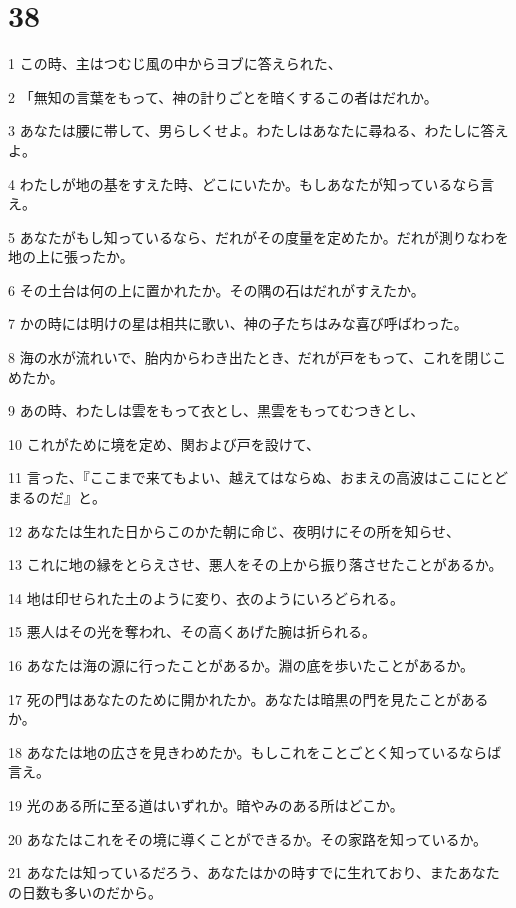 \chapter{38}

\par 1 この時、主はつむじ風の中からヨブに答えられた、
\par 2 「無知の言葉をもって、神の計りごとを暗くするこの者はだれか。
\par 3 あなたは腰に帯して、男らしくせよ。わたしはあなたに尋ねる、わたしに答えよ。
\par 4 わたしが地の基をすえた時、どこにいたか。もしあなたが知っているなら言え。
\par 5 あなたがもし知っているなら、だれがその度量を定めたか。だれが測りなわを地の上に張ったか。
\par 6 その土台は何の上に置かれたか。その隅の石はだれがすえたか。
\par 7 かの時には明けの星は相共に歌い、神の子たちはみな喜び呼ばわった。
\par 8 海の水が流れいで、胎内からわき出たとき、だれが戸をもって、これを閉じこめたか。
\par 9 あの時、わたしは雲をもって衣とし、黒雲をもってむつきとし、
\par 10 これがために境を定め、関および戸を設けて、
\par 11 言った、『ここまで来てもよい、越えてはならぬ、おまえの高波はここにとどまるのだ』と。
\par 12 あなたは生れた日からこのかた朝に命じ、夜明けにその所を知らせ、
\par 13 これに地の縁をとらえさせ、悪人をその上から振り落させたことがあるか。
\par 14 地は印せられた土のように変り、衣のようにいろどられる。
\par 15 悪人はその光を奪われ、その高くあげた腕は折られる。
\par 16 あなたは海の源に行ったことがあるか。淵の底を歩いたことがあるか。
\par 17 死の門はあなたのために開かれたか。あなたは暗黒の門を見たことがあるか。
\par 18 あなたは地の広さを見きわめたか。もしこれをことごとく知っているならば言え。
\par 19 光のある所に至る道はいずれか。暗やみのある所はどこか。
\par 20 あなたはこれをその境に導くことができるか。その家路を知っているか。
\par 21 あなたは知っているだろう、あなたはかの時すでに生れており、またあなたの日数も多いのだから。

